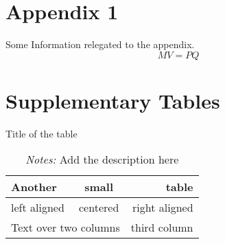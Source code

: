 \documentclass[a4paper,12pt]{scrartcl} %
\begin{document}
\clearpage


\onehalfspacing


\printbibliography %




\clearpage
\appendix
{} %

\section{Appendix 1}

Some Information relegated to the appendix.
\begin{equation}
    MV=PQ
\end{equation}

\pagebreak

\section{Supplementary Tables}




\begin{table}[h!] %
\caption{Title of the table}
\label{tab:SuppTable1}
\centering
 \begin{tabular}{lcr}
   Another & small & table\\
\toprule
   left aligned & centered & right aligned \\
   \multicolumn{2}{c}{Text over two columns} & third column \\
\bottomrule
\end{tabular}
\caption*{\footnotesize{\emph{Notes:} Add the description here}}
\end{table}

\clearpage
\end{document}
